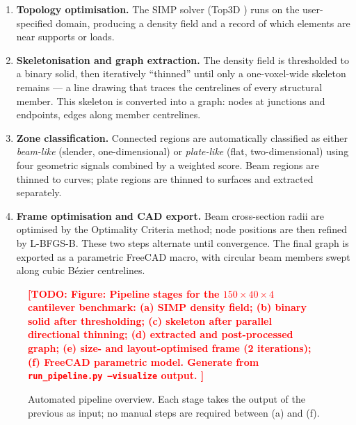 \documentclass[11pt,a4paper]{article}
\newcommand{\TODO}[1]{\textcolor{red}{\textbf{[TODO: #1]}}}
\newcommand{\figstub}[2]{%
  \begin{figure}[htbp]\centering
    \TODO{Figure: #1}\caption{#2}\end{figure}}
\begin{document}
\begin{enumerate}
  \item \textbf{Topology optimisation.}
        The SIMP solver (Top3D \cite{liu2014}) runs on the user-specified
        domain, producing a density field and a record of which elements
        are near supports or loads.

  \item \textbf{Skeletonisation and graph extraction.}
        The density field is thresholded to a binary solid, then iteratively
        ``thinned'' until only a one-voxel-wide skeleton remains --- a line
        drawing that traces the centrelines of every structural member.
        This skeleton is converted into a graph: nodes at junctions and
        endpoints, edges along member centrelines.

  \item \textbf{Zone classification.}
        Connected regions are automatically classified as either
        \emph{beam-like} (slender, one-dimensional) or
        \emph{plate-like} (flat, two-dimensional) using four geometric
        signals combined by a weighted score.
        Beam regions are thinned to curves; plate regions are thinned to
        surfaces and extracted separately.

  \item \textbf{Frame optimisation and CAD export.}
        Beam cross-section radii are optimised by the Optimality Criteria
        method; node positions are then refined by L-BFGS-B.
        These two steps alternate until convergence.
        The final graph is exported as a parametric FreeCAD macro, with
        circular beam members swept along cubic Bézier centrelines.
\end{enumerate}

\figstub{%
  Pipeline stages for the $150\times40\times4$ cantilever benchmark:
  (a) SIMP density field; (b) binary solid after thresholding;
  (c) skeleton after parallel directional thinning;
  (d) extracted and post-processed graph;
  (e) size- and layout-optimised frame (2 iterations);
  (f) FreeCAD parametric model. Generate from \texttt{run\_pipeline.py
  --visualize} output.
}{%
  Automated pipeline overview. Each stage takes the output of the previous
  as input; no manual steps are required between (a) and (f).%
  \label{fig:pipeline_overview}}
\end{document}
